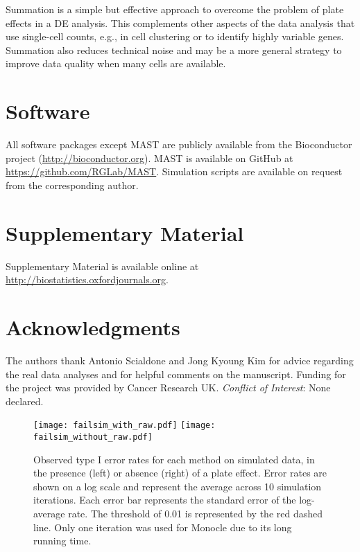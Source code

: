 \documentclass[oupdraft]{bio}
\begin{document}
Summation is a simple but effective approach to overcome the problem of plate effects in a DE analysis. 
This complements other aspects of the data analysis that use single-cell counts, e.g., in cell clustering or to identify highly variable genes.
Summation also reduces technical noise and may be a more general strategy to improve data quality when many cells are available.

\section{Software}
\label{sec5}
All software packages except MAST are publicly available from the Bioconductor project (\url{http://bioconductor.org}).
MAST is available on GitHub at \url{https://github.com/RGLab/MAST}.
Simulation scripts are available on request from the corresponding author.

\section{Supplementary Material}
Supplementary Material is available online at \href{http://biostatistics.oxfordjournals.org}{http://biostatistics.oxfordjournals.org}.

\section*{Acknowledgments}
The authors thank Antonio Scialdone and Jong Kyoung Kim for advice regarding the real data analyses and for helpful comments on the manuscript.
Funding for the project was provided by Cancer Research UK.
{\it Conflict of Interest}: None declared.




\begin{figure}[!p]
\begin{center}
\texttt{[image: failsim\_with\_raw.pdf]}
\texttt{[image: failsim\_without\_raw.pdf]}
\end{center}
\caption{
    Observed type I error rates for each method on simulated data, in the presence (left) or absence (right) of a plate effect.
    Error rates are shown on a log scale and represent the average across 10 simulation iterations.
    Each error bar represents the standard error of the log-average rate.
    The threshold of 0.01 is represented by the red dashed line.
    Only one iteration was used for Monocle due to its long running time.
}
\label{fig:platefail}
\end{figure}
\end{document}
